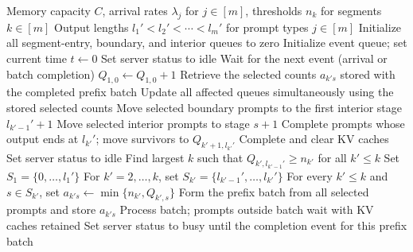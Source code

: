 \begin{algorithm}[h]
\caption{Nested WAIT: Nested Waiting for Accumulated Inference Threshold}
\label{alg:nested_wait}
{\small\linespread{1.0}\selectfont
\begin{algorithmic}[1]
\Require Memory capacity \( C \), arrival rates \( \lambda_j \) for \( j \in [m] \), thresholds \( n_k \) for segments \( k \in [m] \)
\Require Output lengths \( l_1' < l_2' < \cdots < l_m' \) for prompt types \( j \in [m] \)
    \Statex {}
    \Statex {}
    \State Initialize all segment-entry, boundary, and interior queues to zero
\State Initialize event queue; set current time \( t \gets 0 \)
\State Set server status to idle
    \State Wait for the next event (arrival or batch completion)
        \State \( Q_{1,0} \gets Q_{1,0} + 1 \)  
        \State Retrieve the selected counts \(a_{k's}\) stored with the completed prefix batch
        \State Update all affected queues simultaneously using the stored selected counts
                \State Move selected boundary prompts to the first interior stage \(l_{k'-1}'+1\)
                \State Move selected interior prompts to stage \(s+1\)
            \Else
                    \State Complete prompts whose output ends at \(l_{k'}'\); move survivors to \(Q_{k'+1,l_{k'}'}\)
                \Else
                    \State Complete and clear KV caches
                \EndIf
            \EndIf
        \EndFor
        \EndFor
        \State Set server status to idle
    \EndIf
    \State Find largest \( k \) such that \( Q_{k', l_{k'-1}'} \geq n_{k'} \) for all \( k' \leq k \) 
        \State Set \(S_1=\{0,\ldots,l_1'\}\)
        \State For \(k'=2,\ldots,k\), set \(S_{k'}=\{l_{k'-1}',\ldots,l_{k'}'\}\)
        \State For every \(k'\le k\) and \(s\in S_{k'}\), set \(a_{k's}\gets\min\{n_{k'},Q_{k',s}\}\)
        \State Form the prefix batch from all selected prompts and store \(a_{k's}\)
        \State Process batch; prompts outside batch wait with KV caches retained
        \State Set server status to busy until the completion event for this prefix batch
    \EndIf
\EndWhile
\end{algorithmic}
}
\end{algorithm}

